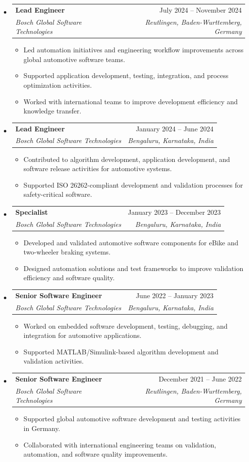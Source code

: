 \documentclass[11pt,a4paper]{article}
\makeatletter
\newcommand{\resumeItem}[1]{\item\small{#1}}
\newcommand{\resumeSubheading}[4]{
  \vspace{-1pt}\item
    \begin{tabular*}{\textwidth}{l@{\extracolsep{\fill}}r}
      \textbf{#1} & #2 \\
      \textit{\small#3} & \textit{\small #4} \\
    \end{tabular*}\vspace{-5pt}
}
\makeatother
\begin{document}
\begin{itemize}[leftmargin=0.15in]
\resumeSubheading
{Lead Engineer}{July 2024 -- November 2024}
{Bosch Global Software Technologies}{Reutlingen, Baden-Wurttemberg, Germany}
\vspace{4pt}
\begin{itemize}
    \resumeItem{Led automation initiatives and engineering workflow improvements across global automotive software teams.}
    \resumeItem{Supported application development, testing, integration, and process optimization activities.}
    \resumeItem{Worked with international teams to improve development efficiency and knowledge transfer.}
\end{itemize}
\vspace{30pt}
\resumeSubheading
{Lead Engineer}{January 2024 -- June 2024}
{Bosch Global Software Technologies}{Bengaluru, Karnataka, India}
\vspace{4pt}
\begin{itemize}
    \resumeItem{Contributed to algorithm development, application development, and software release activities for automotive systems.}
    \resumeItem{Supported ISO 26262-compliant development and validation processes for safety-critical software.}
\end{itemize}
\vspace{10pt}

\resumeSubheading
{Specialist}{January 2023 -- December 2023}
{Bosch Global Software Technologies}{Bengaluru, Karnataka, India}
\vspace{4pt}
\begin{itemize}
    \resumeItem{Developed and validated automotive software components for eBike and two-wheeler braking systems.}
    \resumeItem{Designed automation solutions and test frameworks to improve validation efficiency and software quality.}
\end{itemize}
\vspace{10pt}
\resumeSubheading
{Senior Software Engineer}{June 2022 -- January 2023}
{Bosch Global Software Technologies}{Bengaluru, Karnataka, India}
\vspace{4pt}
\begin{itemize}
    \resumeItem{Worked on embedded software development, testing, debugging, and integration for automotive applications.}
    \resumeItem{Supported MATLAB/Simulink-based algorithm development and validation activities.}
\end{itemize}
\vspace{10pt}
\resumeSubheading
{Senior Software Engineer}{December 2021 -- June 2022}
{Bosch Global Software Technologies}{Reutlingen, Baden-Wurttemberg, Germany}
\vspace{4pt}
\begin{itemize}
    \resumeItem{Supported global automotive software development and testing activities in Germany.}
    \resumeItem{Collaborated with international engineering teams on validation, automation, and software quality improvements.}
\end{itemize}
\vspace{10pt}


\end{itemize}
\end{document}
